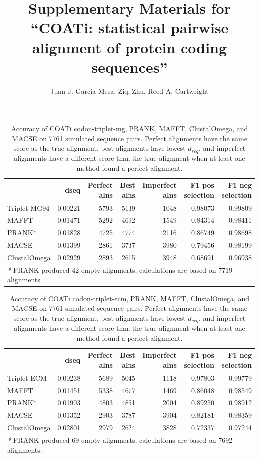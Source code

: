 \documentclass[
]{article}
\title{Supplementary Materials for ``COATi: statistical pairwise
alignment of protein coding sequences''}
\author{Juan J. Garcia Mesa, Ziqi Zhu, Reed A. Cartwright}
\date{}
\begin{document}
\maketitle

\begin{table}[H]

\caption{\label{tab:table-results-1}Accuracy of COATi codon-triplet-mg, PRANK, MAFFT, ClustalOmega, and MACSE on 7761 simulated sequence pairs. Perfect alignments have the same score as the true alignment, best alignments have lowest $d_{seq}$, and imperfect alignments have a different score than the true alignment when at least one method found a perfect alignment.}
\centering
\begin{tabular}[t]{l|r|r|r|r|r|r}
\hline
  & dseq & Perfect alns & Best alns & Imperfect alns & F1 pos selection & F1 neg selection\\
\hline
Triplet-MG94 & 0.00221 & 5793 & 5139 & 1048 & 0.98073 & 0.99809\\
\hline
MAFFT & 0.01471 & 5292 & 4692 & 1549 & 0.84314 & 0.98411\\
\hline
PRANK* & 0.01828 & 4725 & 4774 & 2116 & 0.86749 & 0.98698\\
\hline
MACSE & 0.01399 & 2861 & 3737 & 3980 & 0.79456 & 0.98199\\
\hline
ClustalOmega & 0.02929 & 2893 & 2615 & 3948 & 0.68691 & 0.96938\\
\hline
\multicolumn{7}{l}{\rule{0pt}{1em}\textit{*} PRANK produced 42 empty alignments, calculations are based on 7719 alignments.}\\
\end{tabular}
\end{table}
\begin{table}[H]

\caption{\label{tab:table-results-2}Accuracy of COATi codon-triplet-ecm, PRANK, MAFFT, ClustalOmega, and MACSE on 7761 simulated sequence pairs. Perfect alignments have the same score as the true alignment, best alignments have lowest $d_{seq}$, and imperfect alignments have a different score than the true alignment when at least one method found a perfect alignment.}
\centering
\begin{tabular}[t]{l|r|r|r|r|r|r}
\hline
  & dseq & Perfect alns & Best alns & Imperfect alns & F1 pos selection & F1 neg selection\\
\hline
Triplet-ECM & 0.00238 & 5689 & 5045 & 1118 & 0.97803 & 0.99779\\
\hline
MAFFT & 0.01451 & 5338 & 4677 & 1469 & 0.86048 & 0.98549\\
\hline
PRANK* & 0.01903 & 4803 & 4851 & 2004 & 0.89250 & 0.98912\\
\hline
MACSE & 0.01352 & 2903 & 3787 & 3904 & 0.82181 & 0.98359\\
\hline
ClustalOmega & 0.02801 & 2979 & 2624 & 3828 & 0.72337 & 0.97244\\
\hline
\multicolumn{7}{l}{\rule{0pt}{1em}\textit{*} PRANK produced 69 empty alignments, calculations are based on 7692 alignments.}\\
\end{tabular}
\end{table}
\end{document}

